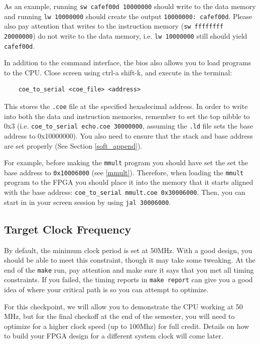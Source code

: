 \documentclass[11pt]{article}
\begin{document}
As an example, running \verb|sw cafef00d 10000000| should write to the data memory and running \verb|lw 10000000| should create the output \verb|10000000: cafef00d|. Please also pay attention that writes to the instruction memory (\verb|sw ffffffff 20000000|) do not write to the data memory, i.e. \verb|lw 10000000| still should yield \verb|cafef00d|.

In addition to the command interface, the bios also allows you to load programs to the CPU. Close screen using ctrl-a shift-k, and execute in the terminal:
\begin{verbatim}
    coe_to_serial <coe_file> <address>
\end{verbatim}

This stores the \verb|.coe| file at the specified hexadecimal address. In order to write into both the data and instruction memories, remember to set the top nibble to 0x3 (i.e. \verb|coe_to_serial echo.coe 30000000|, assuming the \verb|.ld| file sets the base address to 0x10000000). You also need to ensure that the stack and base address are set properly (See Section \ref{soft_append}).

For example, before making the \verb|mmult| program you should have set the set the base address to \verb|0x10006000| (see \ref{mmult}). Therefore, when loading the \verb|mmult| program to the FPGA you should place it into the memory that it starts aligned with the base address: \verb|coe_to_serial mmult.coe 0x30006000|. Then, you can start in in your screen session by using \verb|jal 30006000|.

\subsection{Target Clock Frequency}
By default, the minimum clock period is set at 50MHz. With a good design, you should be able to meet this constraint, though it may take some tweaking. At the end of the \verb|make| run, pay attention and make sure it says that you met all timing constraints. If you failed, the timing reports in \verb|make report| can give you a good idea of where your critical path is so you can attempt to optimize.

For this checkpoint, we will allow you to demonstrate the CPU working at 50 MHz, but for the final checkoff at the end of the semester, you will need to optimize for a higher clock speed (up to 100Mhz) for full credit. Details on how to build your FPGA design for a different system clock will come later.
\end{document}
